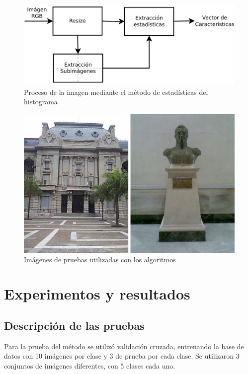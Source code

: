 \documentclass[conference,spanish,a4paper,10pt,oneside,final]{tfmpd}
\begin{document}
\begin{figure}
\begin{center}
\includegraphics[scale=0.25]{../diagramas/procesoestadisticas} 
\end{center}
\caption{Proceso de la imagen mediante el método de estadísticas del histograma}
\label{procesoestadisticas}
\end{figure}
\begin{figure}
\begin{center}
\includegraphics[scale=0.25]{../diagramas/dibujo} 
\end{center}
\caption{Imágenes de pruebas utilizadas con los algoritmos}
\label{imagenes}
\end{figure}
%
%
%
%
\section{Experimentos y resultados}
%
%
\subsection{Descripción de las pruebas}
Para la prueba del método se utilizó validación cruzada, entrenando la base de
datos con 10 imágenes por clase y 3 de prueba por cada clase. Se utilizaron
3 conjuntos de imágenes diferentes, con 5 clases cada uno.
\end{document}
